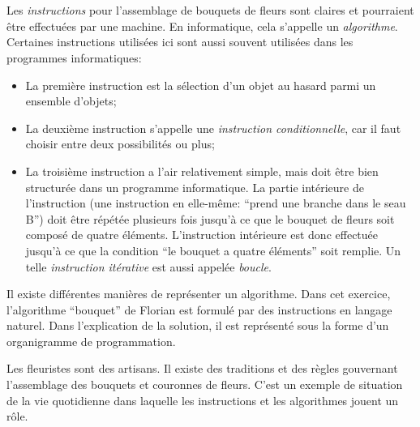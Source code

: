 {{%
\section*{\BrochureItsInformatics}
Les \emph{instructions} pour l’assemblage de bouquets de fleurs sont claires et pourraient être effectuées par une machine. En informatique, cela s’appelle un \emph{algorithme}. Certaines instructions utilisées ici sont aussi souvent utilisées dans les programmes informatiques:

\begin{itemize}
  \item La première instruction est la sélection d’un objet au hasard parmi un ensemble d’objets;
  \item La deuxième instruction s’appelle une \emph{instruction conditionnelle}, car il faut choisir entre deux possibilités ou plus;
  \item La troisième instruction a l’air relativement simple, mais doit être bien structurée dans un programme informatique. La partie intérieure de l’instruction (une instruction en elle-même: “prend une branche dans le seau B”) doit être répétée plusieurs fois jusqu’à ce que le bouquet de fleurs soit composé de quatre éléments. L’instruction intérieure est donc effectuée jusqu’à ce que la condition “le bouquet a quatre éléments” soit remplie. Un telle \emph{instruction itérative} est aussi appelée \emph{boucle}.
\end{itemize}

Il existe différentes manières de représenter un algorithme. Dans cet exercice, l’algorithme “bouquet” de Florian est formulé par des instructions en langage naturel. Dans l’explication de la solution, il est représenté sous la forme d’un organigramme de programmation.

Les fleuristes sont des artisans. Il existe des traditions et des règles gouvernant l’assemblage des bouquets et couronnes de fleurs. C’est un exemple de situation de la vie quotidienne dans laquelle les instructions et les algorithmes jouent un rôle.



}}
